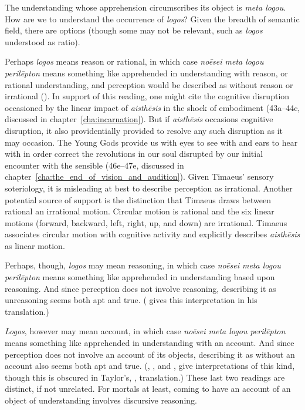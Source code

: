 The understanding whose apprehension circumscribes its object is \emph{meta logou}. How are we to understand the occurrence of \emph{logos}? Given the breadth of semantic field, there are options (though some may not be relevant, such as \emph{logos} understood as ratio). 

Perhaps \emph{logos} means reason or rational, in which case \emph{noēsei meta logou perilēpton} means something like apprehended in understanding with reason, or rational understanding, and perception would be described as without reason or irrational (\citealt[87]{Archer-Hind:1888qd}). In support of this reading, one might cite the cognitive disruption occasioned by the linear impact of \emph{aisthēsis} in the shock of embodiment (43a--44c, discussed in chapter~\ref{cha:incarnation}). But if \emph{aisthēsis} occasions cognitive disruption, it also providentially provided to resolve any such disruption as it may occasion. The Young Gods provide us with eyes to see with and ears to hear with in order correct the revolutions in our soul disrupted by our initial encounter with the sensible (46e--47e, discussed in chapter~\ref{cha:the_end_of_vision_and_audition}). Given Timaeus' sensory soteriology, it is misleading at best to describe perception as irrational. Another potential source of support is the distinction that Timaeus draws between rational an irrational motion. Circular motion is rational and the six linear motions (forward, backward, left, right, up, and down) are irrational. Timaeus associates circular motion with cognitive activity and explicitly describes \emph{aisthēsis} as linear motion.

Perhaps, though, \emph{logos} may mean reasoning, in which case \emph{noēsei meta logou perilēpton} means something like apprehended in understanding based upon reasoning. And since perception does not involve reasoning, describing it as unreasoning seems both apt and true. (\citealt{Bury:1929jb} gives this interpretation in his translation.) 

\emph{Logos}, however may mean account, in which case \emph{noēsei meta logou perilēpton} means something like apprehended in understanding with an account. And since perception does not involve an account of its objects, describing it as without an account also seems both apt and true. (\citealt[61]{Taylor:1928qb}, \citealt[22]{Cornford:1935fk}, and \citealt[16]{Waterfield:2008lx}, give interpretations of this kind, though this is obscured in Taylor's, \citeyear[25]{Taylor:1929ov}, translation.) These last two readings are distinct, if not unrelated. For mortals at least, coming to have an account of an object of understanding involves discursive reasoning.

